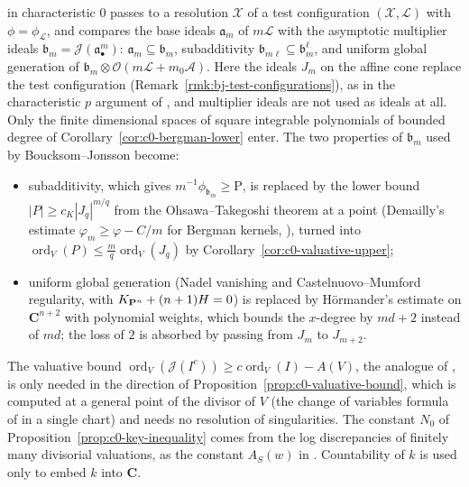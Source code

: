 \begin{remark}\label{rmk:c0-source}
\cite[Theorem~5.20]{BJ22} in characteristic $0$ passes to a resolution $\mathcal X$ of a test configuration $(\mathcal X,\mathcal L)$ with
$\phi=\phi_{\mathcal L}$, and compares the base ideals $\mathfrak a_m$ of $m\mathcal L$ with the asymptotic multiplier ideals
$\mathfrak b_m=\mathcal J(\mathfrak a_\bullet^m)$: $\mathfrak a_m\subseteq\mathfrak b_m$, subadditivity $\mathfrak b_{m\ell}\subseteq\mathfrak b_m^\ell$, and uniform global
generation of $\mathfrak b_m\otimes\mathcal O(m\mathcal L+m_0\mathcal A)$. Here the ideals $J_m$ on the affine cone replace the test
configuration (Remark~\ref{rmk:bj-test-configurations}), as in the characteristic $p$ argument of \cite[\S3]{FHX}, and multiplier ideals
are not used as ideals at all. Only the finite dimensional spaces of square integrable polynomials of bounded degree of
Corollary~\ref{cor:c0-bergman-lower} enter. The two properties of $\mathfrak b_m$ used by Boucksom--Jonsson become:
\begin{itemize}
\item subadditivity, which gives $m^{-1}\phi_{\mathfrak b_m}\ge\mathrm P$, is replaced by the lower bound $|P|\ge c_K|J_q|^{m/q}$ from the
Ohsawa--Takegoshi theorem at a point (Demailly's estimate $\varphi_m\ge\varphi-C/m$ for Bergman kernels, \cite[Theorem~14.2]{DemAM}), turned
into $\operatorname{ord}_V(P)\le\frac mq\operatorname{ord}_V(J_q)$ by Corollary~\ref{cor:c0-valuative-upper};
\item uniform global generation (Nadel vanishing and Castelnuovo--Mumford regularity, with $K_{\mathbf{P}^n}+(n+1)H=0$) is replaced by
H\"ormander's estimate on $\mathbf C^{n+2}$ with polynomial weights, which bounds the $x$-degree by $md+2$ instead of $md$; the loss
of $2$ is absorbed by passing from $J_m$ to $J_{m+2}$.
\end{itemize}
The valuative bound $\operatorname{ord}_V(\mathcal J(I^c))\ge c\operatorname{ord}_V(I)-A(V)$, the analogue of \cite[Lemma~3.3]{FHX}, is only needed in the
direction of Proposition~\ref{prop:c0-valuative-bound}, which is computed at a general point of the divisor of $V$ (the change of
variables formula of \cite[Proposition~5.8]{DemAM} in a single chart) and needs no resolution of singularities. The constant $N_0$ of
Proposition~\ref{prop:c0-key-inequality} comes from the log discrepancies of finitely many divisorial valuations, as the constant
$A_S(w)$ in \cite[\S3]{FHX}. Countability of $k$ is used only to embed $k$ into $\mathbf C$.
\end{remark}
